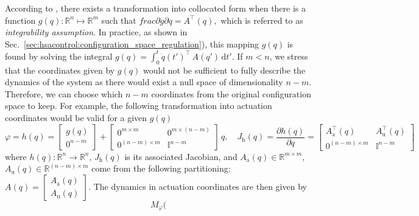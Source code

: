 According to \citet{pustina2024input}, there exists a transformation into collocated form when there is a function $g(q): \mathbb{R}^n \mapsto \mathbb{R}^m$ such that $frac{\partial g}{\partial q} = A^\top (q),$
which is referred to as \emph{integrability assumption}. In practice, as shown in Sec.~\ref{sec:hsacontrol:configuration_space_regulation}), this mapping $g(q)$ is found by solving the integral $g(q) = \int_0^t \dot{q}(t')^\top \, A(q') \, \mathrm{d} t'$.
If $m < n$, we stress that the coordinates given by $g(q)$ would not be sufficient to fully describe the dynamics of the system as there would exist a null space of dimensionality $n - m$. Therefore, we can choose which  $n-m$ coordinates from the original configuration space to keep. For example, the following transformation into actuation coordinates would be valid for a given $g(q)$~\citep{pustina2024input}
\begin{equation}
    \varphi = h(q) = \begin{bmatrix}
        g(q)\\ 0^{n-m}
    \end{bmatrix} + \begin{bmatrix}
        0^{m \times m} & 0^{m \times (n-m)}\\
        0^{(n-m) \times m} & \mathbb{I}^{n-m}
    \end{bmatrix} \, q,
    \quad
    J_\mathrm{h}(q) = \frac{\partial h(q)}{\partial q} = \begin{bmatrix}
        A_\mathrm{a}^\top(q) & A_\mathrm{u}^\top(q)\\
        0^{(n-m) \times m} & \mathbb{I}^{n-m}
    \end{bmatrix}
\end{equation}
where $h(q): \mathbb{R}^{n} \to \mathbb{R}^n$, $J_\mathrm{h}(q)$ is its associated Jacobian, and $A_\mathrm{a}(q) \in \mathbb{R}^{m \times m}$, $A_\mathrm{u}(q) \in \mathbb{R}^{(n-m) \times m}$ come from the following partitioning: $A(q) = \begin{bmatrix}
    A_\mathrm{a}(q)\\ A_\mathrm{u}(q)
\end{bmatrix}$.
The dynamics in actuation coordinates are then given by
\begin{equation}
    M_\varphi(
\end{equation}

